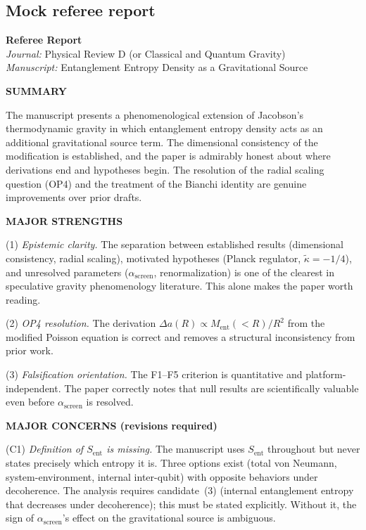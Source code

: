 \documentclass[12pt,letterpaper]{article}
\theoremstyle{plain}
\theoremstyle{definition}
\theoremstyle{remark}
\newcommand{\kt}{\tilde{\kappa}}
\newcommand{\Sent}{S_{\mathrm{ent}}}
\newcommand{\Ment}{M_{\mathrm{ent}}}
\newcommand{\asc}{\alpha_{\mathrm{screen}}}
\begin{document}
\subsection{Mock referee report}

\begin{mdframed}[backgroundcolor=boxgray,linewidth=1pt]
\textbf{Referee Report}\\
\textit{Journal:} Physical Review D (or Classical and Quantum Gravity)\\
\textit{Manuscript:} Entanglement Entropy Density as a Gravitational Source

\medskip\noindent\textbf{SUMMARY}

The manuscript presents a phenomenological extension of Jacobson's thermodynamic gravity
in which entanglement entropy density acts as an additional gravitational source term.
The dimensional consistency of the modification is established, and the paper is
admirably honest about where derivations end and hypotheses begin.  The resolution of the
radial scaling question (OP4) and the treatment of the Bianchi identity are genuine
improvements over prior drafts.

\medskip\noindent\textbf{MAJOR STRENGTHS}

(1) \textit{Epistemic clarity.}  The separation between established results (dimensional
consistency, radial scaling), motivated hypotheses (Planck regulator, $\kt = -1/4$), and
unresolved parameters ($\asc$, renormalization) is one of the clearest in speculative
gravity phenomenology literature.  This alone makes the paper worth reading.

(2) \textit{OP4 resolution.}  The derivation $\Delta a(R) \propto \Ment(<\!R)/R^2$
from the modified Poisson equation is correct and removes a structural inconsistency
from prior work.

(3) \textit{Falsification orientation.}  The F1--F5 criterion is quantitative and
platform-independent.  The paper correctly notes that null results are scientifically
valuable even before $\asc$ is resolved.

\medskip\noindent\textbf{MAJOR CONCERNS (revisions required)}

(C1) \textit{Definition of $\Sent$ is missing.}
The manuscript uses $\Sent$ throughout but never states precisely which entropy it is.
Three options exist (total von Neumann, system-environment, internal inter-qubit) with
opposite behaviors under decoherence.  The analysis requires candidate~(3) (internal
entanglement entropy that decreases under decoherence); this must be stated explicitly.
Without it, the sign of $\asc$'s effect on the gravitational source is ambiguous.


\end{mdframed}
\end{document}
